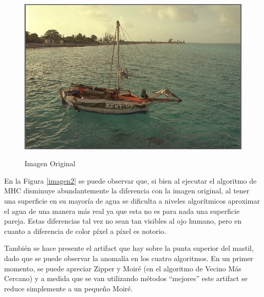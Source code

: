 \documentclass[a4paper]{article}
\begin{document}
\newpage

\begin{figure}[h!]
    \caption{Imagen Original}
    \begin{center}
    \includegraphics[scale=0.15]{imagenes/comparacion/02/img2}
    \label{imgOri2}
  \end{center}
\end{figure}

En la Figura \ref{imagen2}  se puede observar que, si bien al ejecutar el algoritmo de MHC disminuye abundantemente la diferencia con la imagen original, al tener una superficie en su mayor\'ia de agua se dificulta a niveles algor\'itmicos aproximar el agua de una manera m\'as real ya que esta no es para nada una superficie pareja. Estas diferencias tal vez no sean tan visibles al ojo humano, pero en cuanto a diferencia de color p\'ixel a p\'ixel es notorio.

 Tambi\'en se hace presente el artifact que hay sobre la punta superior del mastil, dado que se puede observar la anomalía en los cuatro algoritmos. En un primer momento, se puede apreciar Zipper y Moir\'e
(en el algoritmo de Vecino M\'as Cercano) y a medida que se van utilizando m\'etodos ``mejores'' este artifact se reduce simplemente a un peque\~no Moir\'e. \\
\end{document}
